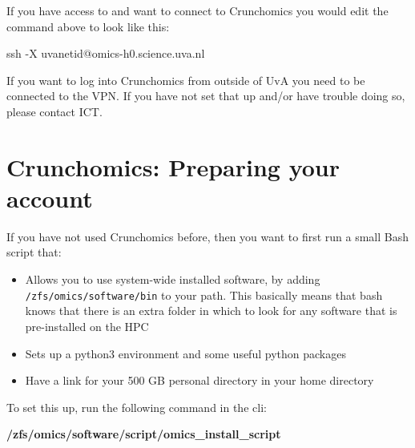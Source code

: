 \documentclass[
  letterpaper,
  DIV=11,
  numbers=noendperiod]{scrreprt}
\newenvironment{Shaded}{}{}
\newcommand{\AttributeTok}[1]{\textcolor[rgb]{0.84,0.23,0.29}{#1}}
\newcommand{\ExtensionTok}[1]{\textcolor[rgb]{0.84,0.23,0.29}{\textbf{#1}}}
\newcommand{\FunctionTok}[1]{\textcolor[rgb]{0.44,0.26,0.76}{#1}}
\newcommand{\NormalTok}[1]{\textcolor[rgb]{0.14,0.16,0.18}{#1}}
\providecommand{\tightlist}{%
  \setlength{\itemsep}{0pt}\setlength{\parskip}{0pt}}\usepackage{longtable,booktabs,array}
\begin{document}
If you have access to and want to connect to Crunchomics you would edit
the command above to look like this:

\begin{Shaded}
\begin{Highlighting}[]
\FunctionTok{ssh} \AttributeTok{{-}X}\NormalTok{ uvanetid@omics{-}h0.science.uva.nl}
\end{Highlighting}
\end{Shaded}

\begin{tcolorbox}[enhanced jigsaw, breakable, colback=white, arc=.35mm, colbacktitle=quarto-callout-important-color!10!white, bottomtitle=1mm, opacitybacktitle=0.6, opacityback=0, rightrule=.15mm, leftrule=.75mm, left=2mm, toptitle=1mm, coltitle=black, title=\textcolor{quarto-callout-important-color}{\faExclamation}\hspace{0.5em}{Important}, bottomrule=.15mm, titlerule=0mm, colframe=quarto-callout-important-color-frame, toprule=.15mm]

If you want to log into Crunchomics from outside of UvA you need to be
connected to the VPN. If you have not set that up and/or have trouble
doing so, please contact ICT.

\end{tcolorbox}

\section{Crunchomics: Preparing your
account}\label{crunchomics-preparing-your-account}

If you have not used Crunchomics before, then you want to first run a
small Bash script that:

\begin{itemize}
\tightlist
\item
  Allows you to use system-wide installed software, by adding
  \texttt{/zfs/omics/software/bin} to your path. This basically means
  that bash knows that there is an extra folder in which to look for any
  software that is pre-installed on the HPC
\item
  Sets up a python3 environment and some useful python packages
\item
  Have a link for your 500 GB personal directory in your home directory
\end{itemize}

To set this up, run the following command in the cli:

\begin{Shaded}
\begin{Highlighting}[]
\ExtensionTok{/zfs/omics/software/script/omics\_install\_script}
\end{Highlighting}
\end{Shaded}
\end{document}
